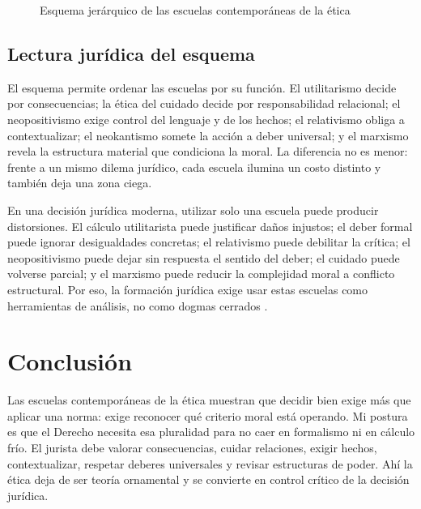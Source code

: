 \documentclass[
	spanish, %
	letterpaper, oneside
]{article}
\begin{document}
\begin{landscape}
\begin{figure}[H]
{}
\caption{Esquema jerárquico de las escuelas contemporáneas de la ética}
\label{fig:esquema-escuelas-eticas}
\end{figure}
\end{landscape}
\pagestyle{fancy}

\subsection{Lectura jurídica del esquema}

El esquema permite ordenar las escuelas por su función. El utilitarismo decide por consecuencias; la ética del cuidado decide por responsabilidad relacional; el neopositivismo exige control del lenguaje y de los hechos; el relativismo obliga a contextualizar; el neokantismo somete la acción a deber universal; y el marxismo revela la estructura material que condiciona la moral. La diferencia no es menor: frente a un mismo dilema jurídico, cada escuela ilumina un costo distinto y también deja una zona ciega.

En una decisión jurídica moderna, utilizar solo una escuela puede producir distorsiones. El cálculo utilitarista puede justificar daños injustos; el deber formal puede ignorar desigualdades concretas; el relativismo puede debilitar la crítica; el neopositivismo puede dejar sin respuesta el sentido del deber; el cuidado puede volverse parcial; y el marxismo puede reducir la complejidad moral a conflicto estructural. Por eso, la formación jurídica exige usar estas escuelas como herramientas de análisis, no como dogmas cerrados \citep{ronquilloarmasEticaGeneralProfesional2018,singerCompendioEtica1995}.

\section{Conclusión}

Las escuelas contemporáneas de la ética muestran que decidir bien exige más que aplicar una norma: exige reconocer qué criterio moral está operando. Mi postura es que el Derecho necesita esa pluralidad para no caer en formalismo ni en cálculo frío. El jurista debe valorar consecuencias, cuidar relaciones, exigir hechos, contextualizar, respetar deberes universales y revisar estructuras de poder. Ahí la ética deja de ser teoría ornamental y se convierte en control crítico de la decisión jurídica.

\clearpage


\end{document}
